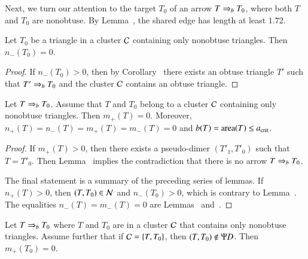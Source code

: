Next, we turn our attention to the target $T_0$ of an arrow $T\Rightarrow_{b} T_0$,
where both $T$ and $T_0$ are nonobtuse.  By
Lemma~, the shared edge has length at least
$1.72$.

\begin{lemma} 
  Let $T_0$ be a triangle in a cluster $\mathcal C$ containing only nonobtuse
  triangles.  Then $n_-(T_0)=0$.
\end{lemma}

\begin{proof} 
  If $n_-(T_0)>0$, then by Corollary~ there
  exists an obtuse triangle $T'$ such that $T'\Rightarrow_{b} T_0$ and the
  cluster $\mathcal C$ contains an obtuse triangle.
\end{proof}

\begin{lemma} 
  Let $T\Rightarrow_{b} T_0$. Assume that $T$ and $T_0$ belong to a cluster $\mathcal C$
 containing only  nonobtuse triangles.  Then
  $m_+(T)=0$.  Moreover, $n_+(T)=n_-(T)=m_+(T)=m_-(T)=0$ and
  $b(T)={\operatorname{area}}(T)\le a_\text{crit}$.
\end{lemma}

\begin{proof}
  If $m_+(T)>0$, then there exists a pseudo-dimer $(T'_1,T'_0)$ such
  that $T=T'_0$.  Then Lemma~ implies the
  contradiction that there is no arrow $T\Rightarrow_{b} T_0$.

  The final statement is a summary of the preceding series of lemmas.
   If $n_+(T)>0$, then $(T,T_0)\in\mathcal N$ and $n_-(T_0)>0$, which is contrary
  to Lemma~.    The equalities $n_-(T)=m_-(T)=0$ are
  Lemmas~ and~.
\end{proof}


\begin{lemma}  
  Let $T\Rightarrow_{b} T_0$ where $T$ and $T_0$ are in a cluster $\mathcal C$ that
  contains only nonobtuse triangles.  Assume further that if
  $\mathcal C=\{T,T_0\}$, then $(T,T_0)\not\in\Psi D$.  Then $m_+(T_0)=0$.
\end{lemma}

